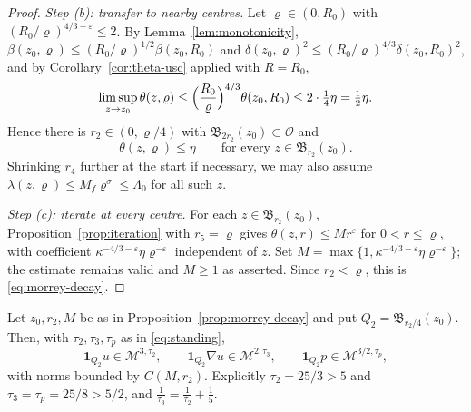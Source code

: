 \documentclass[11pt,reqno]{amsart}
\begin{document}
\begin{proof}
\emph{Step (b): transfer to nearby centres.} Let $\varrho\in(0,R_{0})$ with
$(R_{0}/\varrho)^{4/3+\varepsilon}\le2$. By Lemma~\ref{lem:monotonicity},
$\beta(z_{0},\varrho)\le(R_{0}/\varrho)^{1/2}\beta(z_{0},R_{0})$ and
$\delta(z_{0},\varrho)^{2}\le(R_{0}/\varrho)^{4/3}\delta(z_{0},R_{0})^{2}$, and
by Corollary~\ref{cor:theta-usc} applied with $R=R_{0}$,
\[
  \limsup_{z\to z_{0}}\theta(z,\varrho)
  \le\Bigl(\frac{R_{0}}{\varrho}\Bigr)^{4/3}\theta(z_{0},R_{0})
  \le2\cdot\tfrac14\eta=\tfrac12\eta .
\]
Hence there is $r_{2}\in(0,\varrho/4)$ with
$\mathfrak{B}_{2r_{2}}(z_{0})\subset\mathcal{O}$ and
\begin{equation}\label{eq:transfer}
  \theta(z,\varrho)\le\eta
  \qquad\text{for every }z\in\mathfrak{B}_{r_{2}}(z_{0}).
\end{equation}
Shrinking $r_{4}$ further at the start if necessary, we may also assume
$\lambda(z,\varrho)\le M_{f}\varrho^{\sigma}\le\Lambda_{0}$ for all such $z$.

\emph{Step (c): iterate at every centre.} For each
$z\in\mathfrak{B}_{r_{2}}(z_{0})$, Proposition~\ref{prop:iteration} with
$r_{5}=\varrho$ gives $\theta(z,r)\le M r^{\varepsilon}$ for $0<r\le\varrho$,
with coefficient $\kappa^{-4/3-\varepsilon}\eta\varrho^{-\varepsilon}$
independent of $z$. Set
$M=\max\{1,\kappa^{-4/3-\varepsilon}\eta\varrho^{-\varepsilon}\}$;
the estimate remains valid and $M\ge1$ as asserted.
Since $r_{2}<\varrho$, this is \eqref{eq:morrey-decay}.
\end{proof}

\begin{lemma}\label{lem:step2-morrey-balls}
Let $z_{0},r_{2},M$ be as in Proposition~\ref{prop:morrey-decay} and put
$Q_{2}=\mathfrak{B}_{r_{2}/4}(z_{0})$. Then, with $\tau_{2},\tau_{3},\tau_{p}$
as in \eqref{eq:standing},
\begin{equation}\label{eq:step2-morrey}
  \mathbf{1}_{Q_{2}}u\in\mathcal{M}^{3,\tau_{2}},
  \qquad
  \mathbf{1}_{Q_{2}}\nabla u\in\mathcal{M}^{2,\tau_{3}},
  \qquad
  \mathbf{1}_{Q_{2}}p\in\mathcal{M}^{3/2,\tau_{p}},
\end{equation}
with norms bounded by $C(M,r_{2})$. Explicitly $\tau_{2}=25/3>5$ and
$\tau_{3}=\tau_{p}=25/8>5/2$, and $\tfrac1{\tau_{3}}=\tfrac1{\tau_{2}}+\tfrac15$.
\end{lemma}
\end{document}
